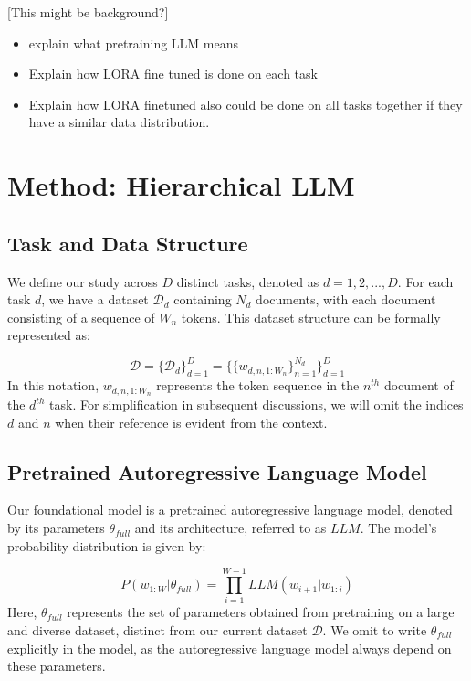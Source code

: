\documentclass{article}
\begin{document}
[This might be background?]
\begin{itemize}
    \item explain what pretraining LLM means
    \item Explain how LORA fine tuned is done on each task
    \item Explain how LORA finetuned also could be done on all tasks together if they have a similar data distribution.
\end{itemize}

\section{Method: Hierarchical LLM}


\subsection{Task and Data Structure}
We define our study across $D$ distinct tasks, denoted as $d=1,2,...,D$. For each task $d$, we have a dataset $\mathcal{D}_d$ containing $N_d$ documents, with each document consisting of a sequence of $W_n$ tokens. This dataset structure can be formally represented as:

\begin{equation} \label{eq:data}
\mathcal{D} = \{ \mathcal{D}_d \}_{d=1}^D  =  \{ \{ w_{d,n,1:W_n} \}_{n=1}^{N_d} \}_{d=1}^D
\end{equation}
%
In this notation, $w_{d,n,1:W_n}$ represents the token sequence in the $n^{th}$ document of the $d^{th}$ task. For simplification in subsequent discussions, we will omit the indices $d$ and $n$ when their reference is evident from the context.

\subsection{Pretrained Autoregressive Language Model}
Our foundational model is a pretrained autoregressive language model, denoted by its parameters $\theta_{full}$ and its architecture, referred to as $LLM$. The model's probability distribution is given by:

\begin{equation} \label{eq:LLMprob}
P(w_{1:W} | \theta_{full}) = \prod_{i=1}^{W-1} LLM(w_{i+1} | w_{1:i})
\end{equation}
%
Here, $\theta_{full}$ represents the set of parameters obtained from pretraining on a large and diverse dataset, distinct from our current dataset $\mathcal{D}$.
We omit to write $\theta_{full}$ explicitly in the model, as the autoregressive language model always depend on these parameters.
\end{document}
